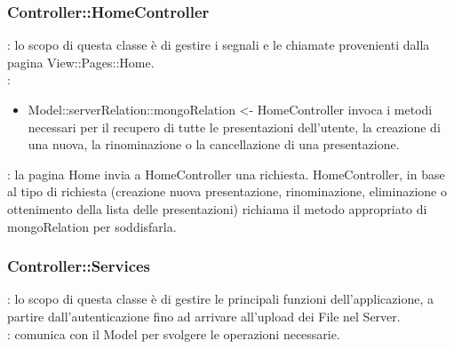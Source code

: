 {	\subsubsection{Controller::\-HomeController}{
		\textbf{\tipo}: lo scopo di questa classe è di gestire i segnali e le chiamate provenienti dalla pagina View::\-Pages::\-Home.\\	
		\textbf{\relaz}:
		\begin{itemize}
			\item Model::\-serverRelation::\-mongoRelation <- HomeController invoca i metodi necessari per il recupero di tutte le presentazioni dell'utente, la creazione di una nuova, la rinominazione o la cancellazione di una presentazione.
		\end{itemize}
		\textbf{\interfacce}: la pagina Home invia a HomeController una richiesta. HomeController, in base al tipo di richiesta (creazione nuova presentazione, rinominazione, eliminazione o ottenimento della lista delle presentazioni) richiama il metodo appropriato di mongoRelation per soddisfarla.
	}


	\subsubsection{Controller::\-Services}{
		\textbf{\tipo}: lo scopo di questa classe è di gestire le principali funzioni dell'applicazione, a partire dall'autenticazione fino ad arrivare all'upload dei File nel Server.\\	
		\textbf{\relaz}: comunica con il Model per svolgere le operazioni necessarie.


}}
